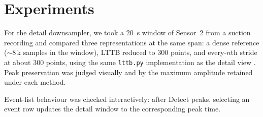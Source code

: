 
\section{Experiments}

For the detail downsampler, we took a \SI{20}{\second} window of Sensor~2 from a suction
recording and compared three representations at the same span: a dense reference
(\(\sim\)8\,k samples in the window), LTTB reduced to 300 points, and every-$n$th stride at
about 300 points, using the same \texttt{lttb.py} implementation as the detail view
\cite{steinarsson2013}. Peak preservation was judged visually and by the maximum amplitude
retained under each method.

Event-list behaviour was checked interactively: after Detect peaks, selecting an event row
updates the detail window to the corresponding peak time.
